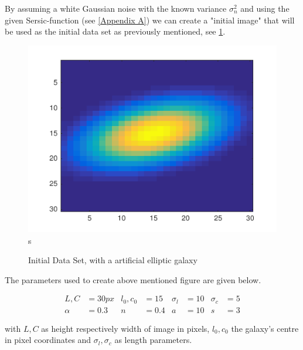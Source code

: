 By assuming a white Gaussian noise with the known variance $\sigma_n^2$ and using the given Sersic-function (see \cref{Appendix A}) we can create a "initial image" that will be used as the initial data set as previously mentioned, see \cref{img:initial}.
\begin{figure}[!h]
	\centering
	\includegraphics{images/galaxy_initial}s
	\caption{Initial Data Set, with a artificial elliptic galaxy}
	\label{img:initial}
\end{figure}

The parameters used to create above mentioned figure are given below.


	\begin{align*}
		L, C & = 30px & l_0, c_0 & = 15 & \sigma_l & = 10 & \sigma_c & = 5 \\
		\alpha & = 0.3 & n & = 0.4 & a & = 10 & s & = 3 
	\end{align*}

with $L,C$ as height respectively width of image in pixels, $l_0, c_0$ the galaxy's centre in pixel coordinates and $\sigma_l, \sigma_c$ as length parameters.


